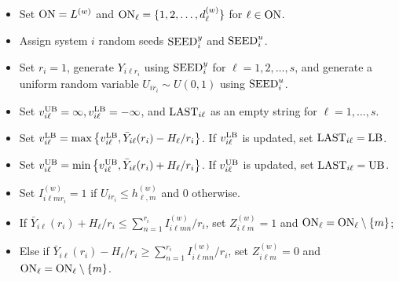 \documentclass[11pt]{article}
\begin{document}
\begin{algorithm}[h!]
{\begin{algorithmic}
        
        \State [{\bf Initialization}:] 
        \begin{itemize}
            \item Set ${\rm ON} = L^{(w)}$ and ${\rm ON}_\ell = \{1, 2, \ldots, d_\ell^{(w)}\}$ for $\ell\in {\rm ON}$.
            \item Assign system $i$ random seeds ${\rm SEED}^y_i$ and ${\rm SEED}^u_i$.
            \item Set $r_i=1$, generate $Y_{i\ell r_i}$ using ${\rm SEED}^y_i$ for $\ell=1,2,\ldots,s$, and generate a uniform random variable $U_{i r_i}\sim U(0,1)$ using ${\rm SEED}^u_i$.  
            \item Set $v_{i\ell}^{\rm UB}=\infty,v_{i\ell}^{\rm LB}=-\infty$, and ${\rm LAST}_{i\ell}$ as an empty string for $\ell=1,\ldots,s$.
        \end{itemize}
            \begin{itemize}
            \setlength{\itemindent}{0.15in}
                \item[] Set $v_{i\ell}^{\rm LB}=\max \left\{v_{i\ell}^{\rm LB}, \bar{Y}_{i\ell}(r_i)-H_\ell/r_i\right\}$. If $v_{i\ell}^{\rm LB}$ is updated, set ${\rm LAST}_{i\ell}={\rm LB}$.
                \item[] Set $v_{i\ell}^{\rm UB}=\min \left\{v_{i\ell}^{\rm UB}, \bar{Y}_{i\ell}(r_i)+H_\ell/r_i\right\}$. If $v_{i\ell}^{\rm UB}$ is updated, set ${\rm LAST}_{i\ell}={\rm UB}$.
            \end{itemize}
		\begin{itemize}
			\setlength{\itemindent}{0.4in}
            \item[] Set $I_{i \ell m r_i}^{(w)}=1$ if $U_{i r_i} \le h_{\ell, m}^{(w)}$ and 0 otherwise.
            \item[] If $\bar{Y}_{i\ell}(r_i)+H_\ell/r_i \leq \sum_{n=1}^{r_i} I_{i \ell m n}^{(w)}/r_i$, set $Z_{i\ell m}^{(w)}=1$ and ${\rm ON}_\ell = {\rm ON}_\ell\setminus \{m\}$;
			\item[] Else if $\bar{Y}_{i\ell}(r_i)-H_\ell/r_i\geq \sum_{n=1}^{r_i} I_{i \ell m n}^{(w)}/r_i$, set $ Z_{i\ell m}^{(w)}=0$ and ${\rm ON}_\ell = {\rm ON}_\ell\setminus \{m\}$. 

\end{itemize}
\end{algorithmic}}
\end{algorithm}
\end{document}
